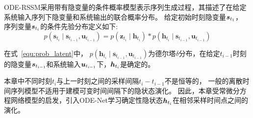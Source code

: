 
ODE-RSSM采用带有隐变量的条件概率模型表示序列生成过程，其描述了在给定系统输入序列下隐变量和系统输出的联合概率分布。
给定初始时刻隐变量$\boldsymbol{s}_{t_1}$， 序列变量$\boldsymbol{s}_{t_i}$的条件先验分布定义如下:
\begin{equation}
p\left(\boldsymbol{s}_{t_{i}} \mid \boldsymbol{s}_{t_{i-1}}, \boldsymbol{u}_{t_{i-1}}\right)=p\left(\boldsymbol{z}_{t_{i}} \mid \boldsymbol{h}_{t_{i}}\right)*
p\left(\boldsymbol{h}_{t_{i}} \mid \boldsymbol{s}_{t_{i-1}}, \boldsymbol{u}_{t_{i-1}}\right)
\label{equ:prob_latent}
\end{equation}

在式~\eqref{equ:prob_latent}中， $p\left(\boldsymbol{h}_{t_{i}} \mid \boldsymbol{s}_{t_{i-1}}, \boldsymbol{u}_{t_{i-1}}\right)$为德尔塔$\delta$分布，在给定$t_{i-1}$时刻的隐变量$\boldsymbol{s}_{t_{i-1}}$和系统输入$\boldsymbol{u}_{t_{i-1}}$下，$\boldsymbol{h}_{t_i}$是确定的。

本章中不同时刻$t_i$与上一时刻之间的采样间隔$t_i - t_{i-1}$不是恒等的，
一般的离散时间序列模型不适用于建模可变时间间隔下的隐状态演化。
因此，本章受常微分方程网络模型\cite{chen2018neuralode,Rubanova2019}的启发，引入ODE-Net学习确定性隐状态$\boldsymbol{h}_{t_i}$在相邻采样时间点之间的演化。

